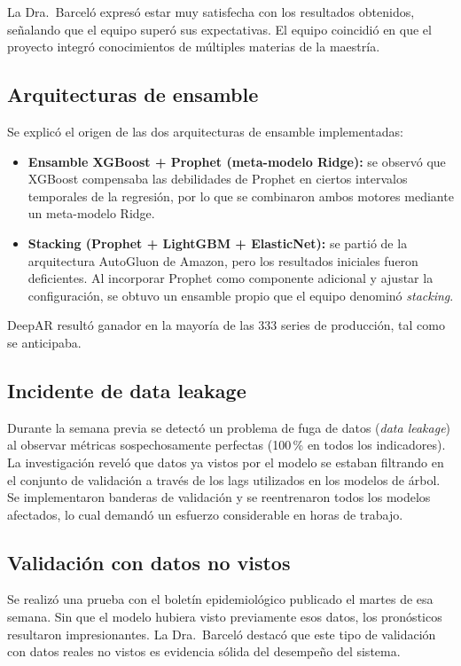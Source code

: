 \documentclass[11pt,letterpaper]{article}
\begin{document}
La Dra.\ Barceló expresó estar muy satisfecha con los resultados obtenidos, señalando que el equipo superó sus expectativas. El equipo coincidió en que el proyecto integró conocimientos de múltiples materias de la maestría.

\subsection{Arquitecturas de ensamble}

Se explicó el origen de las dos arquitecturas de ensamble implementadas:

\begin{itemize}[leftmargin=1.5em]
    \item \textbf{Ensamble XGBoost + Prophet (meta-modelo Ridge):} se observó que XGBoost compensaba las debilidades de Prophet en ciertos intervalos temporales de la regresión, por lo que se combinaron ambos motores mediante un meta-modelo Ridge.
    \item \textbf{Stacking (Prophet + LightGBM + ElasticNet):} se partió de la arquitectura AutoGluon de Amazon, pero los resultados iniciales fueron deficientes. Al incorporar Prophet como componente adicional y ajustar la configuración, se obtuvo un ensamble propio que el equipo denominó \emph{stacking}.
\end{itemize}

DeepAR resultó ganador en la mayoría de las 333 series de producción, tal como se anticipaba.

\subsection{Incidente de data leakage}

Durante la semana previa se detectó un problema de fuga de datos (\emph{data leakage}) al observar métricas sospechosamente perfectas (100\,\% en todos los indicadores). La investigación reveló que datos ya vistos por el modelo se estaban filtrando en el conjunto de validación a través de los lags utilizados en los modelos de árbol. Se implementaron banderas de validación y se reentrenaron todos los modelos afectados, lo cual demandó un esfuerzo considerable en horas de trabajo.

\subsection{Validación con datos no vistos}

Se realizó una prueba con el boletín epidemiológico publicado el martes de esa semana. Sin que el modelo hubiera visto previamente esos datos, los pronósticos resultaron impresionantes. La Dra.\ Barceló destacó que este tipo de validación con datos reales no vistos es evidencia sólida del desempeño del sistema.
\end{document}
